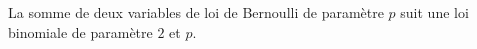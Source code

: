 La somme de deux variables de loi de Bernoulli de paramètre $p$ suit une loi binomiale de paramètre $2$ et $p$.

\begin{reponses}
\end{reponses}

